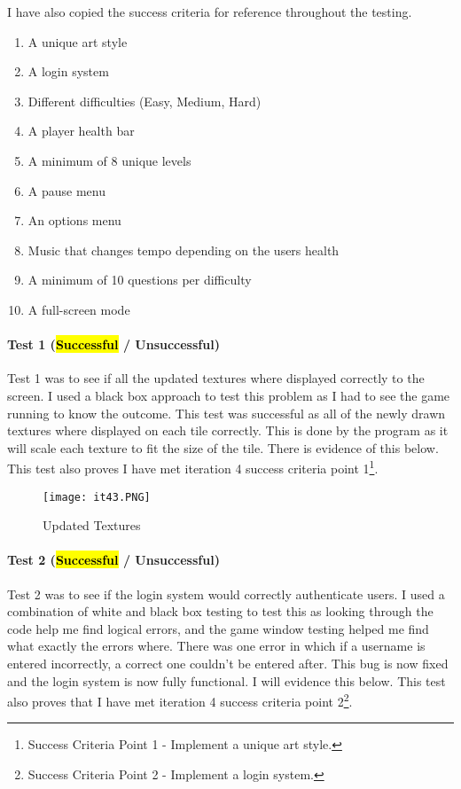\documentclass[12pt]{report}
\begin{document}
I have also copied the success criteria for reference throughout the testing. 

\small

\begin{enumerate}
    \item A unique art style
    \item A login system
    \item Different difficulties (Easy, Medium, Hard)
    \item A player health bar
    \item A minimum of 8 unique levels
    \item A pause menu 
    \item An options menu
    \item Music that changes tempo depending on the users health
    \item A minimum of 10 questions per difficulty
    \item A full-screen mode
\end{enumerate}

\normalsize 

\paragraph{Test 1 (\hl{Successful} / Unsuccessful)}
Test 1 was to see if all the updated textures where displayed correctly to the screen. I used a black box approach to test this problem as I had to see the game running to know the outcome. This test was successful as all of the newly drawn textures where displayed on each tile correctly. This is done by the program as it will scale each texture to fit the size of the tile. There is evidence of this below. This test also proves I have met iteration 4 success criteria point 1\footnote{Success Criteria Point 1 - Implement a unique art style.}. 

\begin{figure}[H]
    \centering
    \texttt{[image: it43.PNG]}
    \caption{Updated Textures}
\end{figure}

\paragraph{Test 2 (\hl{Successful} / Unsuccessful)}
Test 2 was to see if the login system would correctly authenticate users. I used a combination of white and black box testing to test this as looking through the code help me find logical errors, and the game window testing helped me find what exactly the errors where. There was one error in which if a username is entered incorrectly, a correct one couldn't be entered after. This bug is now fixed and the login system is now fully functional. I will evidence this below. This test also proves that I have met iteration 4 success criteria point 2\footnote{Success Criteria Point 2 - Implement a login system.}.
\end{document}
